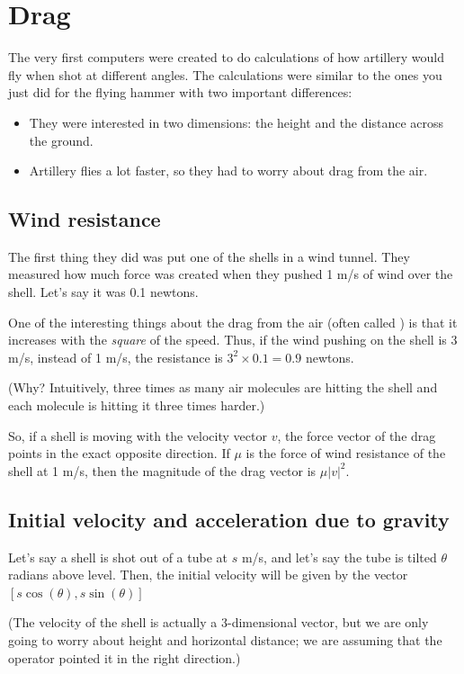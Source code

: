 \chapter{Drag}

The very first computers were created to do calculations of how
artillery would fly when shot at different angles. The calculations
were similar to the ones you just did for the flying
hammer with two important differences:
\begin{itemize}
\item They were interested in two dimensions: the height and the distance across the ground.
\item Artillery flies a lot faster, so they had to worry about drag from the air.
\end{itemize}

\section{Wind resistance}

The first thing they did was put one of the shells in a wind tunnel.
They measured how much force was created when they pushed 1 m/s of
wind over the shell. Let's say it was 0.1 newtons.

One of the interesting things about the drag from the air (often
called ) is that it increases with the
\emph{square} of the speed. Thus, if the wind pushing on the shell is
3 m/s, instead of 1 m/s, the resistance is $3^2 \times 0.1 = 0.9$
newtons.

(Why? Intuitively, three times as many air molecules are hitting the
shell and each molecule is hitting it three times harder.)

So, if a shell is moving with the velocity vector $v$, the force
vector of the drag points in the exact opposite direction. If $\mu$ is
the force of wind resistance of the shell at 1 m/s, then the magnitude
of the drag vector is $\mu |v|^2$.

\section{Initial velocity and acceleration due to gravity}

Let's say a shell is shot out of a tube at $s$ m/s, and let's say the tube
is tilted $\theta$ radians above level.  Then, the initial velocity
will be given by the vector $[s \cos(\theta), s \sin(\theta)]$

(The velocity of the shell is actually a 3-dimensional vector, but we
are only going to worry about height and horizontal distance; we are
assuming that the operator pointed it in the right direction.)


